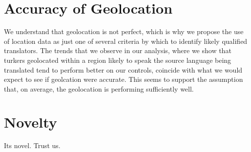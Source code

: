 \documentclass[11pt]{article}
\begin{document}
\section{Accuracy of Geolocation}

We understand that geolocation is not perfect, which is why we propose the use of location data as just one of several criteria by which to identify likely qualified translators. The trends that we observe in our analysis, where we show that turkers geolocated within a region likely to speak the source language being translated tend to perform better on our controls, coincide with what we would expect to see if geolcation were accurate. This seems to support the assumption that, on average, the geolocation is performing sufficiently well.

\section{Novelty}

Its novel. Trust us.
\end{document}
